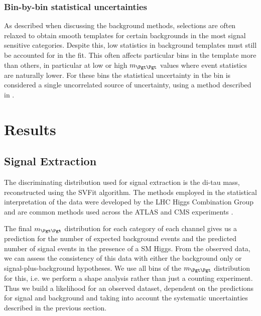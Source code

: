 \subsubsection{\textbf{Bin-by-bin statistical uncertainties}}
As described when discussing the background methods, selections are often
relaxed to obtain smooth templates for certain backgrounds in the most signal
sensitive categories. Despite this, low statistics in background templates must
still be accounted for in the fit. This often affects particular bins in the
template more than others, in particular at low or high $m_{\Pgt\Pgt}$ values
where event statistics are naturally lower. For these bins the statistical
uncertainty in the bin is considered a single uncorrelated source of
uncertainty, using a method described in \cite{Barlow1993219}. 

\section{Results}
\label{sec:results}

\subsection{Signal Extraction}
\label{sec:signalextraction}

The discriminating distribution used for signal extraction is the di-tau mass,
reconstructed using the SVFit algorithm. The methods employed in the statistical
interpretation of the data were developed by the LHC Higgs Combination Group and
are common methods used across the ATLAS and CMS experiments \cite{LHC-HCG-Report}.

The final $m_{\Pgt\Pgt}$ distribution for each category of each channel gives
us a prediction for the number of expected background events and the predicted number of signal
events in the presence of a \ac{SM} Higgs. From the observed data, we can assess
the consistency of this data with either the background only or
signal-plus-background hypotheses. We use all bins of the $m_{\Pgt\Pgt}$
distribution for this, i.e. we perform a shape analysis rather than just a
counting experiment. Thus we build a likelihood for an observed dataset,
dependent on the predictions for signal and background and taking into account
the systematic uncertainties described in the previous section.

